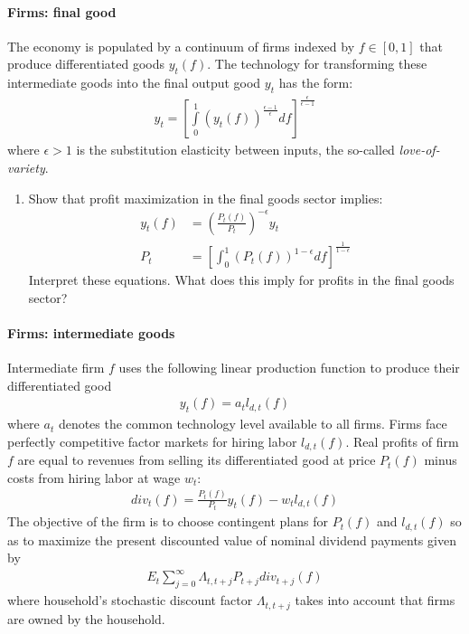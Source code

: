 \paragraph{Firms: final good}
The economy is populated by a continuum of firms indexed by \(f \in [0,1]\) that produce differentiated goods \(y_t(f)\).
The technology for transforming these intermediate goods into the final output good \(y_t\) has the \textcite{Dixit.Stiglitz_1977_MonopolisticCompetitionOptimum} form:
\begin{align}
y_t = {\left[\int\limits_0^1 {(y_t(f))}^{\frac{\epsilon-1}{\epsilon}}df\right]}^{\frac{\epsilon}{\epsilon-1}} \label{eq:Firms_DS_Aggregator}
\end{align}
where \(\epsilon>1\) is the substitution elasticity between inputs, the so-called \emph{love-of-variety}. 
\begin{enumerate}[resume]
\item Show that profit maximization in the final goods sector implies:
\begin{align*}
y_t(f) &= {\left(\frac{P_t(f)}{P_t}\right)}^{-\epsilon} y_t
\\
P_t &= {\left[\int_{0}^{1} {(P_t(f))}^{1-\epsilon}df\right]}^{\frac{1}{1-\epsilon}}
\end{align*}
Interpret these equations. What does this imply for profits in the final goods sector?
\end{enumerate}

\paragraph{Firms: intermediate goods}
Intermediate firm \(f\) uses the following linear production function to produce their differentiated good
\begin{align}
y_t(f) = a_t l_{d,t}(f) \label{eq:Firms_ProductionFunction}
\end{align}
where \(a_t\) denotes the common technology level available to all firms.
Firms face perfectly competitive factor markets for hiring labor \(l_{d,t}(f)\).
Real profits of firm \(f\) are equal to revenues from selling its differentiated good at price \(P_t(f)\) minus costs from hiring labor at wage \(w_t\):
\begin{align}
{div}_t(f) = \frac{P_t(f)}{P_t} y_t(f) - w_t l_{d,t}(f) \label{eq:Firms.Profits}
\end{align}
The objective of the firm is to choose contingent plans for \(P_t(f)\) and \(l_{d,t}(f)\) so as to maximize the present discounted value of nominal dividend payments given by
\begin{align*}
E_t \sum_{j=0}^{\infty}\Lambda_{t,t+j} P_{t+j} div_{t+j}(f)
\end{align*}
where household's stochastic discount factor \(\Lambda_{t,t+j}\) takes into account that firms are owned by the household.

